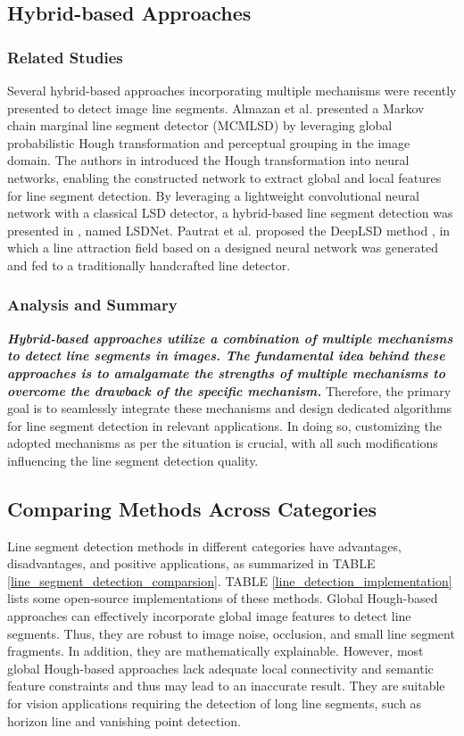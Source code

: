 \documentclass[journal,compsoc]{IEEEtran}
\begin{document}
\subsection{Hybrid-based Approaches}
\label{subsec_hybrid}
\subsubsection{Related Studies}
Several hybrid-based approaches incorporating multiple mechanisms were recently presented to detect image line segments. Almazan et al. presented a Markov chain marginal line segment detector (MCMLSD) \cite{MCMLSD} by leveraging global probabilistic Hough transformation and perceptual grouping in the image domain. The authors in \cite{DeepHoughTransformLinePriors, LinedetectionviaalightweightCNNwithaHoughlayer} introduced the Hough transformation into neural networks, enabling the constructed network to extract global and local features for line segment detection. By leveraging a lightweight convolutional neural network with a classical LSD detector, a hybrid-based line segment detection was presented in \cite{LSDNet}, named LSDNet. Pautrat et al. proposed the DeepLSD method \cite{DeepLSD}, in which a line attraction field based on a designed neural network was generated and fed to a traditionally handcrafted line detector.

\subsubsection{Analysis and Summary}
\textbf{\textit{Hybrid-based approaches utilize a combination of multiple mechanisms to detect line segments in images. The fundamental idea behind these approaches is to amalgamate the strengths of multiple mechanisms to overcome the drawback of the specific mechanism.}} Therefore, the primary goal is to seamlessly integrate these mechanisms and design dedicated algorithms for line segment detection in relevant applications. In doing so, customizing the adopted mechanisms as per the situation is crucial, with all such modifications influencing the line segment detection quality.


\subsection{Comparing Methods Across Categories}
\label{subsec_detection_pro_cons}
Line segment detection methods in different categories have advantages, disadvantages, and positive applications, as summarized in TABLE \ref{line_segment_detection_comparsion}. TABLE \ref{line_detection_implementation} lists some open-source implementations of these methods. Global Hough-based approaches can effectively incorporate global image features to detect line segments. Thus, they are robust to image noise, occlusion, and small line segment fragments. In addition, they are mathematically explainable. However, most global Hough-based approaches lack adequate local connectivity and semantic feature constraints and thus may lead to an inaccurate result. They are suitable for vision applications requiring the detection of long line segments, such as horizon line \cite{10.1145/2964284.2967198} and vanishing point \cite{10.1007/978-3-030-01249-6_20} detection.
\end{document}
